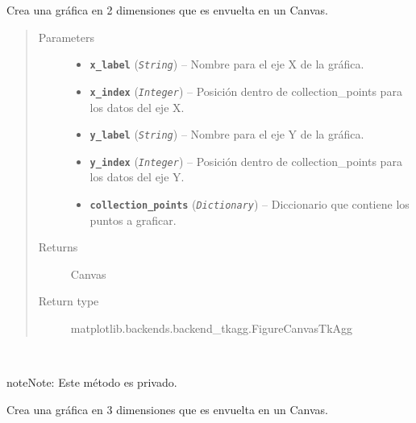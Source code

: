 \documentclass[class=report, crop=false]{standalone}
\begin{document}
\begin{fulllineitems}
\begin{fulllineitems}
Crea una gráfica en 2 dimensiones que es envuelta en 
un Canvas.

\begin{quote}\begin{description}
\item[{Parameters}] \leavevmode\begin{itemize}
\item \textbf{\texttt{x\_label}} (\emph{\texttt{String}}) -- Nombre para el eje X de la gráfica.
\item \textbf{\texttt{x\_index}} (\emph{\texttt{Integer}}) -- Posición dentro de collection\_points para los datos del eje X.
\item \textbf{\texttt{y\_label}} (\emph{\texttt{String}}) -- Nombre para el eje Y de la gráfica.
\item \textbf{\texttt{y\_index}} (\emph{\texttt{Integer}}) -- Posición dentro de collection\_points para los datos del eje Y.
\item \textbf{\texttt{collection\_points}} (\emph{\texttt{Dictionary}}) -- Diccionario que contiene los puntos a graficar.
\end{itemize}

\item[{Returns}] \leavevmode
Canvas
\item[{Return type}] \leavevmode
matplotlib.backends.backend\_tkagg.FigureCanvasTkAgg
\end{description}\end{quote}

\end{fulllineitems}

\begin{fulllineitems}

~

\begin{notice}{note}{Note:}
Este método es privado.
\end{notice}

Crea una gráfica en 3 dimensiones que es envuelta en 
un Canvas.


\end{fulllineitems}
\end{fulllineitems}
\end{document}
